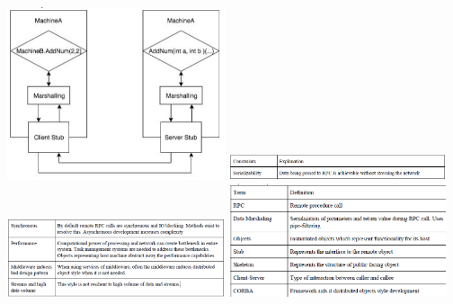 \begin{center}
    \includegraphics[width=0.48\textwidth]{./distributed1}
    \includegraphics[width=0.48\textwidth]{./distributed2}
    \includegraphics[width=0.48\textwidth]{./distributed3}
    \includegraphics[width=0.48\textwidth]{./distributed4}
\end{center}
